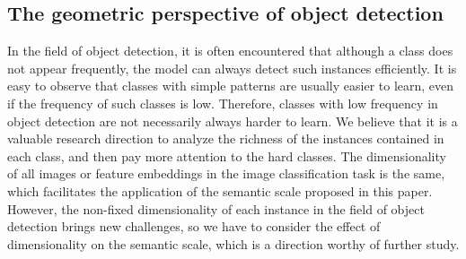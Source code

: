 \documentclass[10pt,twocolumn,letterpaper]{article}
\begin{document}
\subsection*{The geometric perspective of object detection}

In the field of object detection, it is often encountered that although a class does not appear frequently, the model can always detect such instances efficiently. It is easy to observe that classes with simple patterns are usually easier to learn, even if the frequency of such classes is low. Therefore, classes with low frequency in object detection are not necessarily always harder to learn. We believe that it is a valuable research direction to analyze the richness of the instances contained in each class, and then pay more attention to the hard classes. The dimensionality of all images or feature embeddings in the image classification task is the same, which facilitates the application of the semantic scale proposed in this paper. However, the non-fixed dimensionality of each instance in the field of object detection brings new challenges, so we have to consider the effect of dimensionality on the semantic scale, which is a direction worthy of further study.
\end{document}
